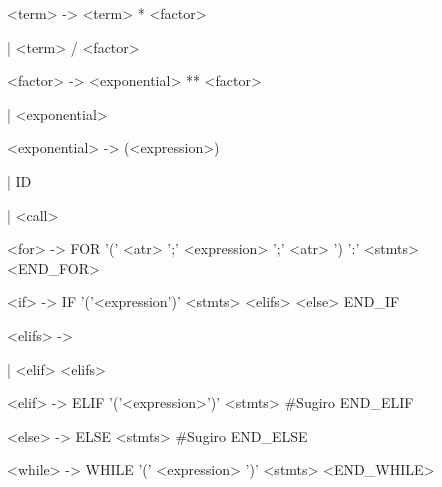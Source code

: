 <term> -> <term> * <factor> 

\hspace{2cm}| <term> / <factor>

<factor> -> <exponential> ** <factor> 

\hspace{2cm}| <exponential>

<exponential> -> (<expression>) 

\hspace{2cm}| ID 

\hspace{2cm}| <call> 


<for> -> FOR '(' <atr> ';' <expression> ';' <atr> ') ':' <stmts> <END\_FOR>
    
<if> -> IF '('<expression')' <stmts> <elifs> <else> END\_IF

<elifs> -> 

\hspace{2cm}| <elif> <elifs>

<elif> -> ELIF '('<expression>')' <stmts> #Sugiro END_ELIF

<else> -> ELSE <stmts> #Sugiro END_ELSE

<while> -> WHILE '(' <expression> ')' <stmts> <END\_WHILE>



  


	